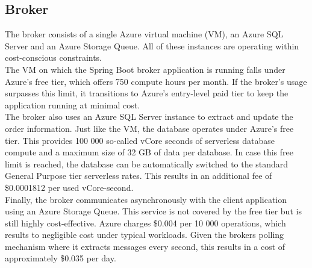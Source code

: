 \documentclass[10pt,a4paper,kul]{kulakarticle} %
\begin{document}
		\subsection{Broker}
			The broker consists of a single Azure virtual machine (VM), an Azure SQL Server and an Azure Storage Queue. All of these instances are operating within cost-conscious constraints. \\		
			The VM on which the Spring Boot broker application is running falls under Azure’s free tier, which offers 750 compute hours per month. If the broker’s usage surpasses this limit, it transitions to Azure’s entry-level paid tier to keep the application running at minimal cost. \\		
			The broker also uses an Azure SQL Server instance to extract and update the order information. Just like the VM, the database operates under Azure’s free tier. This provides 100 000 so-called vCore seconds of serverless database compute and a maximum size of 32 GB of data per database. In case this free limit is reached, the database can be automatically switched to the standard General Purpose tier serverless rates. This results in an additional fee of \$0.0001812 per used vCore-second. \\		
			Finally, the broker communicates asynchronously with the client application using an Azure Storage Queue. This service is not covered by the free tier but is still highly cost-effective. Azure charges \$0.004 per 10 000 operations, which results to negligible cost under typical workloads. Given the brokers polling mechanism where it extracts messages every second, this results in a cost of approximately \$0.035 per day. 
	
\end{document}
